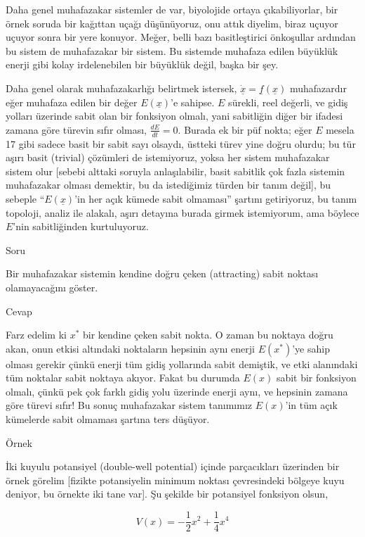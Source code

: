 \documentclass[12pt,fleqn]{article}\usepackage{../../common}
\begin{document}
Daha genel muhafazakar sistemler de var, biyolojide ortaya çıkabiliyorlar, bir
örnek soruda bir kağıttan uçağı düşünüyoruz, onu attık diyelim, biraz uçuyor
uçuyor sonra bir yere konuyor. Meğer, belli bazı basitleştirici önkoşullar
ardından bu sistem de muhafazakar bir sistem. Bu sistemde muhafaza edilen
büyüklük enerji gibi kolay irdelenebilen bir büyüklük değil, başka bir şey. 

Daha genel olarak muhafazakarlığı belirtmek istersek, $\dot{\underline{x}} =
\underline{f} (\underline{x})$ muhafazardır eğer muhafaza edilen bir değer
$E(\underline{x})$'e sahipse. $E$ sürekli, reel değerli, ve gidiş yolları
üzerinde sabit olan bir fonksiyon olmalı, yani sabitliğin diğer bir ifadesi
zamana göre türevin sıfır olması, $\frac{dE}{dt}=0$. Burada ek bir püf nokta;
eğer $E$ mesela 17 gibi sadece basit bir sabit sayı olsaydı, üstteki türev yine
doğru olurdu; bu tür aşırı basit (trivial) çözümleri de istemiyoruz, yoksa her
sistem muhafazakar sistem olur [sebebi alttaki soruyla anlaşılabilir, basit
 sabitlik çok fazla sistemin muhafazakar olması demektir, bu da istediğimiz
 türden bir tanım değil], bu sebeple ``$E(\underline{x})$'in her açık kümede
sabit olmaması'' şartını getiriyoruz, bu tanım topoloji, analiz ile alakalı,
aşırı detayına burada girmek istemiyorum, ama böylece $E$'nin sabitliğinden
kurtuluyoruz.

Soru

Bir muhafazakar sistemin kendine doğru çeken (attracting) sabit noktası
olamayacağını göster.

Cevap

Farz edelim ki $x^*$ bir kendine çeken sabit nokta. O zaman bu noktaya doğru
akan, onun etkisi altındaki noktaların hepsinin aynı enerji $E(x^*)$'ye sahip
olması gerekir çünkü enerji tüm gidiş yollarında sabit demiştik, ve etki
alanındaki tüm noktalar sabit noktaya akıyor. Fakat bu durumda $E(x)$ sabit bir
fonksiyon olmalı, çünkü pek çok farklı gidiş yolu üzerinde enerji aynı, ve
hepsinin zamana göre türevi sıfır! Bu sonuç muhafazakar sistem tanımımız
$E(x)$'in tüm açık kümelerde sabit olmaması şartına ters düşüyor. 

Örnek

İki kuyulu potansiyel (double-well potential) içinde parçacıkları üzerinden bir
örnek görelim [fizikte potansiyelin minimum noktası çevresindeki bölgeye kuyu
deniyor, bu örnekte iki tane var]. Şu şekilde bir potansiyel fonksiyon olsun,

$$ V(x) = -\frac{1}{2}x^2 + \frac{1}{4}x^4 $$
\end{document}
